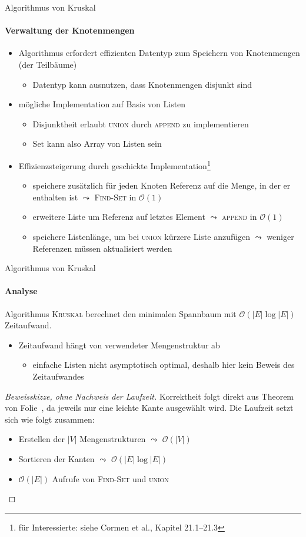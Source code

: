 \documentclass{vorlesung}
\newcommand{\ovon}[1]{\ensuremath{\mathcal{O}(#1)}}
\begin{document}
%
\begin{frame}{Algorithmus von Kruskal}
\framesubtitle{Verwaltung der Knotenmengen}
\begin{itemize}
	\item Algorithmus erfordert effizienten Datentyp zum Speichern von Knotenmengen (der Teilbäume)
	\begin{itemize}
	\item Datentyp kann ausnutzen, dass Knotenmengen disjunkt sind
	\end{itemize}
	\item mögliche Implementation auf Basis von Listen
	\begin{itemize}
		\item Disjunktheit erlaubt \textsc{union} durch \textsc{append} zu implementieren
		\item $\mathrm{Set}$ kann also Array von Listen sein
	\end{itemize}
	\item Effizienzsteigerung durch geschickte Implementation\footnote{für Interessierte: siehe Cormen et al., Kapitel 21.1--21.3}
	\begin{itemize}
		\item speichere zusätzlich für jeden Knoten Referenz auf die Menge, in der er enthalten ist $\leadsto$ \textsc{Find-Set} in \ovon{1} 
		\item erweitere Liste um Referenz auf letztes Element $\leadsto$ \textsc{append} in \ovon{1}
		\item speichere Listenlänge, um bei \textsc{union} kürzere Liste anzufügen $\leadsto$ weniger Referenzen müssen aktualisiert werden
	\end{itemize}
\end{itemize}
\end{frame}
%
\begin{frame}{Algorithmus von Kruskal}
\framesubtitle{Analyse}
\begin{theorem}
Algorithmus \textsc{Kruskal} berechnet den minimalen Spannbaum mit \ovon{|E| \log |E|} Zeitaufwand.
\end{theorem}
\begin{itemize}
	\item Zeitaufwand hängt von verwendeter Mengenstruktur ab
	\begin{itemize}
		\item einfache Listen nicht asymptotisch optimal, deshalb hier kein Beweis des Zeitaufwandes
	\end{itemize}
\end{itemize}
\begin{proof}[Beweisskizze, ohne Nachweis der Laufzeit]
Korrektheit folgt direkt aus Theorem von Folie~\pageref{theo:leicht}, da jeweils nur eine leichte Kante ausgewählt wird. Die Laufzeit setzt sich wie folgt zusammen:
\begin{itemize}
	\item Erstellen der $|V|$ Mengenstrukturen $\leadsto$ \ovon{|V|}
	\item Sortieren der Kanten $\leadsto$ \ovon{|E| \log |E|}
	\item \ovon{|E|} Aufrufe von \textsc{Find-Set} und \textsc{union}
\end{itemize}
\end{proof}
\end{frame}
\end{document}
